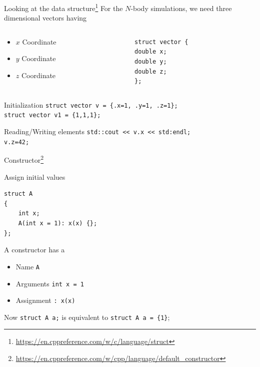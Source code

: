 \documentclass[12pt,t]{beamer}
\begin{document}
\begin{frame}[fragile]{Looking at the data structure\footnote{\tiny\url{https://en.cppreference.com/w/c/language/struct}}}
For the $N$-body simulations, we need three dimensional vectors having
\begin{columns}
\begin{column}{0.5\textwidth}
\begin{itemize}
\item $x$ Coordinate
\item $y$ Coordinate
\item $z$ Coordinate
\end{itemize}
\end{column}
\begin{column}{0.5\textwidth}  %
\begin{lstlisting}
struct vector {
double x;
double y;
double z;
};
\end{lstlisting}
\end{column}
\end{columns} 
\begin{block}{Initialization}
\lstinline|struct vector v = {.x=1, .y=1, .z=1};| \\
\lstinline|struct vector v1 = {1,1,1};|
\end{block}

\begin{block}{Reading/Writing elements }
\lstinline|std::cout << v.x << std:endl;| \\
\lstinline|v.z=42;|
\end{block}
\end{frame}

\begin{frame}[fragile]{Constructor\footnote{\tiny\url{https://en.cppreference.com/w/cpp/language/default_constructor}}}
\begin{block}{Assign initial values}
\begin{lstlisting}
struct A
{
    int x;
    A(int x = 1): x(x) {};
};
\end{lstlisting}
\end{block}

\begin{block}{A constructor has a}
\begin{itemize}
\item Name \lstinline|A| 
\item Arguments \lstinline|int x = 1|
\item Assignment \lstinline|: x(x)|
\end{itemize}
Now \lstinline|struct A a;| is equivalent to \lstinline|struct A a = {1}|;
\end{block}

\end{frame}
\end{document}
